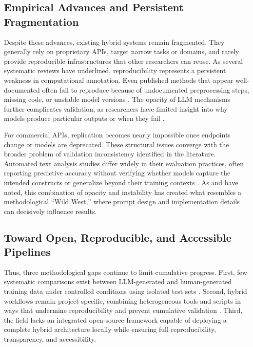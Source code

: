 \documentclass[12pt]{article}
\begin{document}
\subsection{Empirical Advances and Persistent Fragmentation}

Despite these advances, existing hybrid systems remain fragmented. They generally rely on proprietary APIs, target narrow tasks or domains, and rarely provide reproducible infrastructures that other researchers can reuse. As several systematic reviews have underlined, reproducibility represents a persistent weakness in computational annotation. Even published methods that appear well-documented often fail to reproduce because of undocumented preprocessing steps, missing code, or unstable model versions \parencite{chen_etal23, weber_reichardt23}. The opacity of LLM mechanisms further complicates validation, as researchers have limited insight into why models produce particular outputs or when they fail \parencite{zhao_etal24}. 

For commercial APIs, replication becomes nearly impossible once endpoints change or models are deprecated. These structural issues converge with the broader problem of validation inconsistency identified in the literature. Automated text analysis studies differ widely in their evaluation practices, often reporting predictive accuracy without verifying whether models capture the intended constructs or generalize beyond their training contexts \parencite{park_montgomery25, bernhard-harrer_etal25, glockner_etal20}. As \textcite{tornberg24b} and \textcite{atreja_etal24} have noted, this combination of opacity and instability has created what resembles a methodological “Wild West,” where prompt design and implementation details can decisively influence results.

\subsection{Toward Open, Reproducible, and Accessible Pipelines}

Thus, three methodological gaps continue to limit cumulative progress. First, few systematic comparisons exist between LLM-generated and human-generated training data under controlled conditions using isolated test sets \parencite{park_montgomery25, bernhard-harrer_etal25}. Second, hybrid workflows remain project-specific, combining heterogeneous tools and scripts in ways that undermine reproducibility and prevent cumulative validation \parencite{chen_etal23, weber_reichardt23}. Third, the field lacks an integrated open-source framework capable of deploying a complete hybrid architecture locally while ensuring full reproducibility, transparency, and accessibility. 
\end{document}
